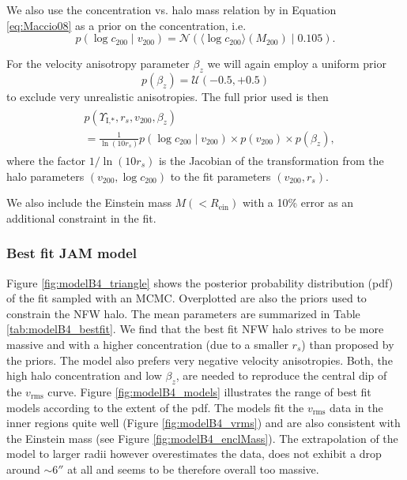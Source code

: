 \documentclass[useAMS,usenatbib]{mnras}
\begin{document}
We also use the concentration vs. halo mass relation by \citet{Maccio08} in Equation \eqref{eq:Maccio08} as a prior on the concentration, i.e.
\begin{equation}
p(\log c_{200} \mid v_{200}) = \mathscr{N}\left(\langle \log c_{200} \rangle (M_{200}) \mid 0.105 \right). \label{eq:prior_c200}
\end{equation}

For the velocity anisotropy parameter $\beta_z$ we will again employ a uniform prior 
\begin{equation}
p(\beta_z) = \mathscr{U}(-0.5,+0.5)
\end{equation}
to exclude very unrealistic anisotropies. The full prior used is then
\begin{align}
\begin{split}
&p(\Upsilon_\text{I,*},r_s,v_{200},\beta_z) \\
&= \frac{1}{\ln\left( 10 r_s\right)} p(\log c_{200} \mid v_{200}) \times p(v_{200}) \times p(\beta_z), 
\end{split}
\end{align}
where the factor $1/\ln\left( 10 r_s\right)$ is the Jacobian of the transformation from the halo parameters $(v_{200},\log c_{200})$ to the fit parameters $(v_{200},r_s)$.

We also include the Einstein mass $M(<R_\text{ein})$ with a 10\% error as an additional constraint in the fit.

\subsubsection{Best fit JAM model} \label{sec:results_JAM_NFW_results}

Figure \ref{fig:modelB4_triangle} shows the posterior probability distribution (pdf) of the fit sampled with an MCMC. Overplotted are also the priors used to constrain the NFW halo. The mean parameters are summarized in Table \ref{tab:modelB4_bestfit}. We find that the best fit NFW halo strives to be more massive and with a higher concentration (due to a smaller $r_s$) than  proposed by the priors. The model also prefers  very negative velocity anisotropies. Both, the high halo concentration and low $\beta_z$, are needed to reproduce the central dip of the $v_\text{rms}$ curve. Figure \ref{fig:modelB4_models} illustrates the range of best fit models according to the extent of the pdf. The models fit the $v_\text{rms}$ data in the inner regions quite well (Figure \ref{fig:modelB4_vrms}) and are also consistent with the Einstein mass (see Figure \ref{fig:modelB4_enclMass}). The extrapolation of the model to larger radii however overestimates the data, does not exhibit a drop around $\sim 6''$ at all and seems to be therefore overall too massive.
\end{document}
